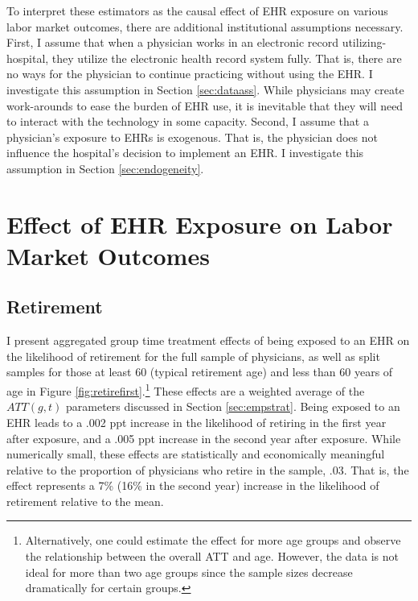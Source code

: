 \documentclass[12pt]{article}
\begin{document}
To interpret these estimators as the causal effect of EHR exposure on various labor market outcomes, there are additional institutional assumptions necessary. First, I assume that when a physician works in an electronic record utilizing-hospital, they utilize the electronic health record system fully. That is, there are no ways for the physician to continue practicing without using the EHR. I investigate this assumption in Section \ref{sec:dataass}. While physicians may create work-arounds to ease the burden of EHR use, it is inevitable that they will need to interact with the technology in some capacity. Second, I assume that a physician's exposure to EHRs is exogenous. That is, the physician does not influence the hospital's decision to implement an EHR. I investigate this assumption in Section \ref{sec:endogeneity}. 







\section{Effect of EHR Exposure on Labor Market Outcomes}


\subsection{Retirement}\label{sec:retire}


I present aggregated group time treatment effects of being exposed to an EHR on the likelihood of retirement for the full sample of physicians, as well as split samples for those at least 60 (typical retirement age) and less than 60 years of age in Figure \ref{fig:retirefirst}.\footnote{Alternatively, one could estimate the effect for more age groups and observe the relationship between the overall ATT and age. However, the data is not ideal for more than two age groups since the sample sizes decrease dramatically for certain groups.} These effects are a weighted average of the $ATT(g,t)$ parameters discussed in Section \ref{sec:empstrat}. Being exposed to an EHR leads to a .002 ppt increase in the likelihood of retiring in the first year after exposure, and a .005 ppt increase in the second year after exposure. While numerically small, these effects are statistically and economically meaningful relative to the proportion of physicians who retire in the sample, .03. That is, the effect represents a 7\% (16\% in the second year) increase in the likelihood of retirement relative to the mean. 
\end{document}
